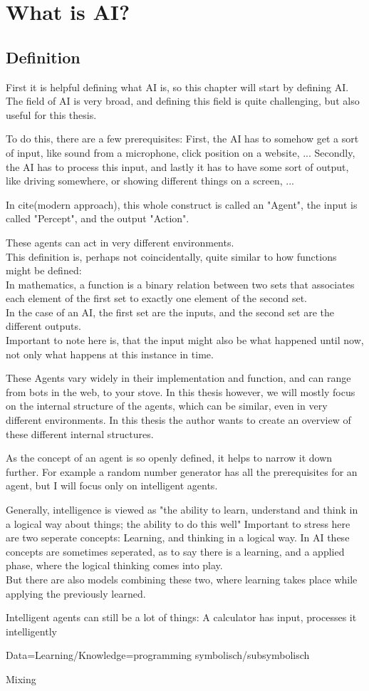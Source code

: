 \chapter{What is AI?}
\section{Definition}
First it is helpful defining what AI is, so this chapter will start by defining AI.
The field of AI is very broad, and defining this field is quite challenging, but also useful for this thesis. 

To do this, there are a few prerequisites: 
First, the AI has to somehow get a sort of input, like sound from a microphone, click position on a website, ... 
Secondly, the AI has to process this input, 
and lastly it has to have some sort of output, like driving somewhere, or showing different things on a screen, ... 

In cite(modern approach), this whole construct is called an "Agent", the input is called "Percept", and the output "Action".

These agents can act in very different environments.\\This definition is, perhaps not coincidentally, quite similar to how functions might be defined: \\In mathematics, a function is a binary relation between two sets that associates each element of the first set to exactly one element of the second set. 
\\In the case of an AI, the first set are the inputs, and the second set are the different outputs. \\Important to note here is, that the input might also be what happened until now, not only what happens at this instance in time. 

These Agents vary widely in their implementation and function, and can range from bots in the web, to your stove. In this thesis however, we will mostly focus on the internal structure of the agents, which can be similar, even in very different environments.
In this thesis the author wants to create an overview of these different internal structures.

As the concept of an agent is so openly defined, it helps to narrow it down further. For example a random number generator has all the prerequisites for an agent, but I will focus only on intelligent agents.

Generally, intelligence is viewed as "the ability to learn, understand and think in a logical way about things; the ability to do this well" 
Important to stress here are two seperate concepts: Learning, and thinking in a logical way.
In AI these concepts are sometimes seperated, as to say there is a learning, and a applied phase, where the logical thinking comes into play. \\But there are also models combining these two, where learning takes place while applying the previously learned.

Intelligent agents can still be a lot of things: A calculator has input, processes it intelligently 

Data=Learning/Knowledge=programming symbolisch/subsymbolisch

Mixing